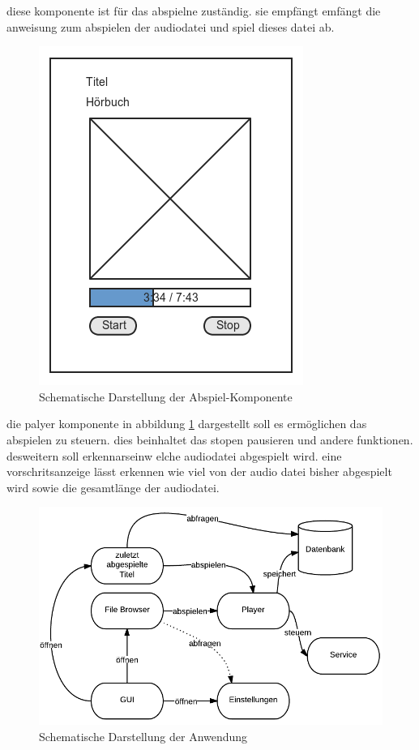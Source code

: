 diese komponente ist für das abspielne zuständig. sie empfängt emfängt die anweisung zum abspielen der audiodatei und spiel dieses datei ab.

\begin{figure}
\begin{center}
\includegraphics[scale=0.6]{images/playerkomp}
\caption{Schematische Darstellung der Abspiel-Komponente}
\label{playerkomp}
\end{center}
\end{figure}

die palyer komponente in abbildung \ref{playerkomp} dargestellt soll es ermöglichen das abspielen zu steuern. dies beinhaltet das stopen pausieren und andere funktionen. desweitern soll erkennarseinw elche audiodatei abgespielt wird. eine vorschritsanzeige lässt erkennen wie viel von der audio datei bisher abgespielt wird sowie die gesamtlänge der audiodatei.

\begin{figure}
\begin{center}
\includegraphics[scale=0.6]{images/konzept}
\caption{Schematische Darstellung der Anwendung}
\label{konzept}
\end{center}
\end{figure}

